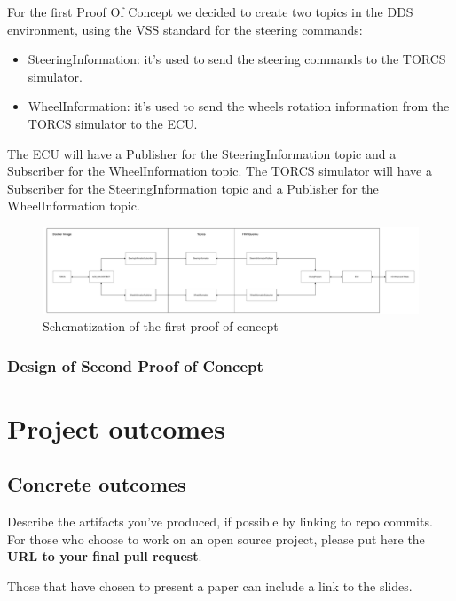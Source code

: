 \documentclass[10pt,a4]{article}
\begin{document}
\par For the first Proof Of Concept we decided to create two topics in the DDS environment,
using the VSS standard for the steering commands:
\begin{itemize}
  \item SteeringInformation: it's used to send the steering commands to the TORCS simulator.
  \item WheelInformation: it's used to send the wheels rotation information from the TORCS simulator to the ECU.
\end{itemize}

\par The ECU will have a Publisher for the SteeringInformation topic and a Subscriber for the WheelInformation topic.
The TORCS simulator will have a Subscriber for the SteeringInformation topic and a Publisher for the WheelInformation topic.

\begin{figure}[H]
  \centering
  \includegraphics[width=1.0\textwidth]{Images/Schematization_PoC_1.pdf}
  \caption{Schematization of the first proof of concept}
  \label{fig:schematization-poc-1}
\end{figure}

\subsubsection{Design of Second Proof of Concept}


\section{Project outcomes}

\subsection{Concrete outcomes}
Describe the artifacts you've produced, if possible by linking to repo commits.
For those who choose to work on an open source project, please put here the
\textbf{URL to your final pull request}.

Those that have chosen to present a paper can include a link to the slides.
\end{document}
